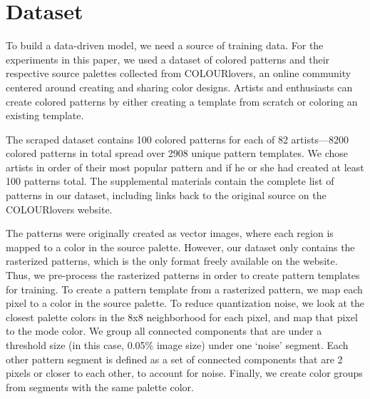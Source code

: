 \section{Dataset}
\label{sec:dataset}

To build a data-driven model, we need a source of training data. For the experiments in this paper, we used a dataset of colored patterns and their respective source palettes collected from COLOURlovers, an online community centered around creating and sharing color designs. Artists and enthusiasts can create colored patterns by either creating a template from scratch or coloring an existing template. 

The scraped dataset contains 100 colored patterns for each of 82 artists---8200 colored patterns in total spread over 2908 unique pattern templates. We chose artists in order of their most popular pattern and if he or she had created at least 100 patterns total. The supplemental materials contain the complete list of patterns in our dataset, including links back to the original source on the COLOURlovers website.

The patterns were originally created as vector images, where each region is mapped to a color in the source palette. However, our dataset only contains the rasterized patterns, which is the only format freely available on the website. Thus, we pre-process the rasterized patterns in order to create pattern templates for training. To create a pattern template from a rasterized pattern, we map each pixel to a color in the source palette. To reduce quantization noise, we look at the closest palette colors in the 8x8 neighborhood for each pixel, and map that pixel to the mode color. We group all connected components that are under a threshold size (in this case, 0.05\% image size) under one `noise' segment. Each other pattern segment is defined as a set of connected components that are 2 pixels or closer to each other, to account for noise. Finally, we create color groups from segments with the same palette color.